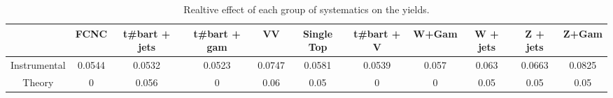 \begin{table}[htbp]
\begin{center}
\begin{tabular}{|c|c|c|c|c|c|c|c|c|c|c|}
\hline 
      & FCNC      & t#bar{t} + jets      & t#bar{t} +  gam      & VV      & Single Top      & t#bar{t} + V      & W+Gam      & W + jets      & Z + jets      & Z+Gam \\ 
\hline 
 Instrumental & 0.0544 & 0.0532 & 0.0523 & 0.0747 & 0.0581 & 0.0539 & 0.057 & 0.063 & 0.0663 & 0.0825 \\ 
 Theory & 0 & 0.056 & 0 & 0.06 & 0.05 & 0 & 0 & 0.05 & 0.05 & 0.05 \\ 
\hline 
\end{tabular} 
\caption{Realtive effect of each group of systematics on the yields.} 
\end{center} 
\end{table} 
